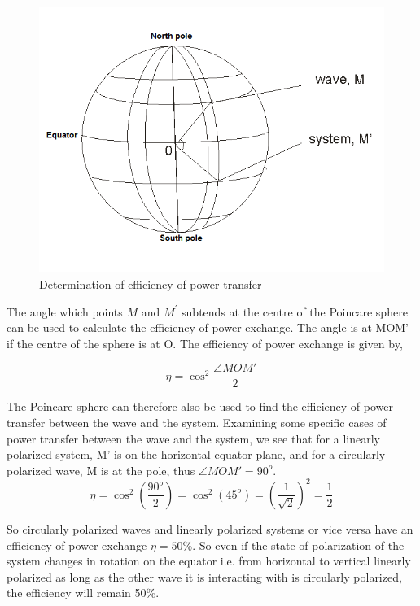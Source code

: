 \begin{figure}
\centering
\includegraphics[width=1\linewidth]{./graphics/power}
\caption{Determination of efficiency of power transfer}
\label{fig:power}
\end{figure}

The angle which points $M$ and $M^'$ subtends at the centre of the Poincare sphere can be used to calculate the efficiency of power exchange.
The angle is at MOM' if the centre of the sphere is at O. The efficiency of power exchange is given by,

\[\eta = \cos^2 {\frac{ \angle  MOM' }{2}}  \]

The Poincare sphere can therefore also be used to find the efficiency of power transfer between the wave and the system. Examining some specific cases of power transfer between the wave and the system, we see that for a linearly polarized system, M' is on the horizontal equator plane, and for a circularly polarized wave, M is at the pole, thus $\angle MOM' = 90^o$.
\[ \eta= \cos ^2(\frac{90^o}{2}) =\cos ^2(45^o) =(\frac{1}{\sqrt{2}})^2  = \frac{1}{2}\]

So circularly polarized waves and linearly polarized systems or vice versa have an efficiency of power exchange $ \eta=  50\% $. So even if the state of polarization of the system changes in rotation on the equator i.e. from horizontal to vertical linearly polarized as long as the other wave it is interacting with is circularly polarized, the efficiency will remain 50\%.

